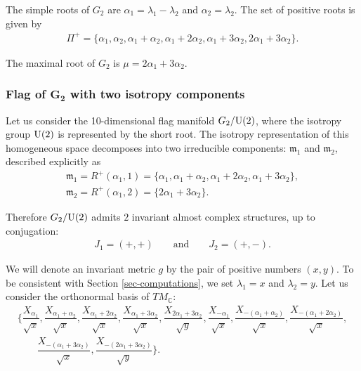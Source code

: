 \documentclass[10pt,a4paper]{amsart}
\numberwithin{equation}{section}
\begin{document}
The simple roots of $G_{2}$ are $\alpha_{1}=\lambda_{1}-\lambda_{2}$ and $\alpha_{2}=\lambda_{2}$. The set of positive roots is given by
\begin{gather*}
\Pi^{+}=\{\alpha_{1},\alpha_{2},\alpha_{1}+\alpha_{2},\alpha_{1}+2\alpha_{2},\alpha_{1}+3\alpha_{2},2\alpha_{1}+3\alpha_{2}\}.
\end{gather*}

The maximal root of $G_{2}$ is $\mu=2\alpha_{1}+3\alpha_{2}$.

\subsubsection[Flag of \protect{$G\textunderscore{}2$} with two isotropy components]
{Flag of $\boldsymbol{G_{2}}$ with two isotropy components}

Let us consider the 10-dimensional flag manifold $G_{2}/{\rm U}(2)$, where the isotropy group ${\rm U}(2)$ is represented by the short root. The isotropy representation of this homogeneous space decomposes into two irreducible components:
$\mathfrak{m}_{1}$ and $\mathfrak{m}_{2}$, described explicitly as
\begin{gather*}
\mathfrak{m}_{1}=R^{+}(\alpha_{1},1)=\{\alpha_{1},\alpha_{1}+\alpha_{2},\alpha_{1} +2\alpha_{2},\alpha_{1}+3\alpha_{2}\},
\\
\mathfrak{m}_{2}=R^{+}(\alpha_{1},2)=\{2\alpha_{1}+3\alpha_{2}\}.
\end{gather*}

Therefore $G_{2}/{\rm U}(2)$ admits $2$ invariant almost complex structures, up to conjugation:
\begin{gather*}
J_{1}=(+,+)\qquad \text{and}\qquad J_{2}=(+,-).
\end{gather*}

We will denote an invariant metric $g$ by the pair of positive numbers $(x,y)$. To be consistent with Section \ref{sec-computations}, we set $\lambda_{1}=x$ and $\lambda_{2}=y$. Let us consider the orthonormal basis of $TM_{\mathbb{C}}$:
\begin{gather*}
\bigg\{\dfrac{X_{\alpha_{1}}}{\sqrt{x}},\dfrac{X_{\alpha_{1}+\alpha_{2}}}{\sqrt{x}}, \dfrac{X_{\alpha_{1}+2\alpha_{2}}}{\sqrt{x}},\dfrac{X_{\alpha_{1}+3\alpha_{2}}}{\sqrt{x}}, \dfrac{X_{2\alpha_{1}+3\alpha_{2}}}{\sqrt{y}},\dfrac{X_{-\alpha_{1}}}{\sqrt{x}},
\dfrac{X_{-(\alpha_{1}+\alpha_{2})}}{\sqrt{x}},\dfrac{X_{-(\alpha_{1}+2\alpha_{2})}}{\sqrt{x}},
\\ \qquad
\dfrac{X_{-(\alpha_{1}+3\alpha_{2})}}{\sqrt{x}},\dfrac{X_{-(2\alpha_{1}+3\alpha_{2})}}{\sqrt{y}}\bigg\}.
\end{gather*}
\end{document}

